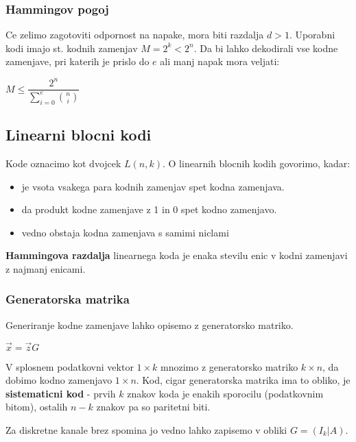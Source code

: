 \documentclass{article}
\begin{document}
\begin{multicols}{4}
	\subsubsection{Hammingov pogoj}
	Ce zelimo zagotoviti odpornost na napake,
	mora biti razdalja $d > 1$. Uporabni kodi imajo st. kodnih zamenjav $M = 2^k < 2^n$.
	Da bi lahko dekodirali vse kodne zamenjave, pri katerih je prislo do $e$ ali manj napak
	mora veljati:
	\begin{center}
		\begin{math}
			M \leq \dfrac{2^n}{\sum_{i=0}^e{n \choose i}}
		\end{math}
	\end{center}

	\subsection{Linearni blocni kodi}
	Kode oznacimo kot dvojcek $L(n, k)$.
	O linearnih blocnih kodih govorimo, kadar:
	\begin{itemize}
		\item je vsota vsakega para kodnih zamenjav spet kodna zamenjava.
		\item da produkt kodne zamenjave z 1 in 0 spet kodno zamenjavo.
		\item vedno obstaja kodna zamenjava s samimi niclami
	\end{itemize}
	\textbf{Hammingova razdalja} linearnega koda je enaka stevilu enic v kodni zamenjavi
	z najmanj enicami.

	\subsubsection{Generatorska matrika}
	Generiranje kodne zamenjave lahko opisemo z generatorsko matriko.

	\begin{center}
		\begin{math}
			\vec{x} = \vec{z}G
		\end{math}
	\end{center}

	V splosnem podatkovni vektor $1 \times k$ mnozimo z generatorsko matriko $k \times n$, da dobimo kodno zamenjavo
	$1 \times n$. Kod, cigar generatorska matrika ima to obliko, je
	\textbf{sistematicni kod} - prvih $k$ znakov koda je enakih sporocilu (podatkovnim bitom), ostalih $n-k$ znakov pa so
	paritetni biti.

	Za diskretne kanale brez spomina jo vedno lahko zapisemo v obliki $G = (I_k | A)$.


\end{multicols}
\end{document}
